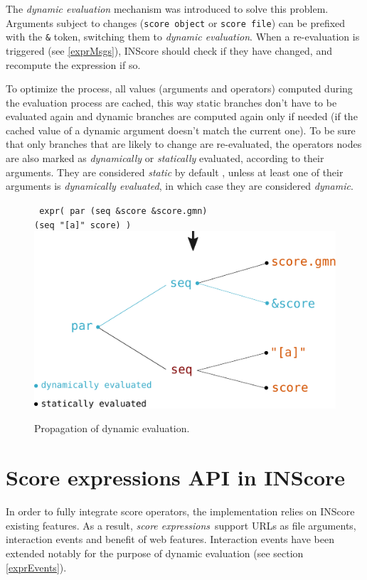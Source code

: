 \documentclass{article}
\newcommand{\OSC}[1]{\texttt{#1}}
\newcommand{\oper}[1]{\textcolor{figRed}{#1}}
\newcommand{\param}[1]{\textcolor{figOrange}{#1}}
\newcommand{\prefix}[1]{\textcolor{figBlue}{#1}}
\newcommand{\sExpr}{\emph{score expressions}}
\newcommand{\tab}{\hspace*{4mm}}
\begin{document}
The \emph{dynamic evaluation} mechanism was introduced to solve this problem. Arguments subject to changes (\OSC{score object} or \OSC{score file}) can be prefixed with the \OSC{\&} token, switching them to \emph{dynamic evaluation}. When a re-evaluation is triggered (see \ref{exprMsgs}), INScore should check if they have changed, and recompute the expression if so.

To optimize the process, all values (arguments and operators) computed during the evaluation process are cached, this way static branches don't have to be evaluated again and dynamic branches are computed again only if needed (if the cached value of a dynamic argument doesn't match the current one). To be sure that only branches that are likely to change are re-evaluated, the operators nodes are also marked as \emph{dynamically} or \emph{statically} evaluated, according to their arguments. They are considered \emph{static} by default 
, unless at least one of their arguments is \emph{dynamically evaluated}, in which case they are considered \emph{dynamic}.

\begin{figure}[th]
\centering
\OSC{ expr( \oper{par} (\oper{seq} \prefix{\&}\param{score} \prefix{\&}\param{score.gmn}) \\
 \tab\tab\tab\tab (\oper{seq} \param{"[a]" score}) )}
\includegraphics[width=0.9\columnwidth]{imgs/dynamicEval}
\caption{Propagation of dynamic evaluation.
\label{fig:dynamicEval}}
\end{figure}



\section{Score expressions API in INScore}
\label{exprAPI}
In order to fully integrate score operators, the implementation relies on INScore existing features. As a result, \sExpr\ support URLs as file arguments, interaction events and benefit of web features. Interaction events have been extended notably for the purpose of dynamic evaluation (see section \ref{exprEvents}).
\end{document}
